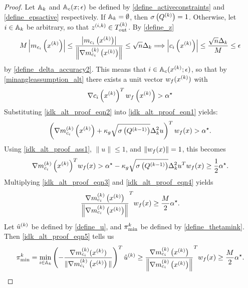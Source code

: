 \begin{proof}
Let ${\mathbb A_{k}}$ and ${\mathbb A_c}(x; \epsilon)$
be defined by
\cref{define_activeconstraints} and \cref{define_epsactive}
respectively.
If ${\mathbb A_{k}} = \emptyset$, then $\sigma\left({Q^{(k)}}\right) = 1$.
Otherwise, let $i \in {\mathbb A_{k}}$ be arbitrary,
so that ${z^{(i, k)}} \in {T_{\text{out}}^{(k)}}$. By \cref{define_z}
\begin{align*}
M \left|m_{c_i}\left(x^{(k)}\right)\right| \le \frac{\left|m_{c_i}\left(x^{(k)}\right)\right|}{\left\|{\nabla m_{c_i}^{(k)}\left(x^{(k)}\right)}\right\|} \le \sqrt{n} \Delta_k \Longrightarrow
\left|c_i\left(x^{(k)}\right)\right| \le \frac{\sqrt{n}\Delta_k}{M} \le \epsilon
\end{align*}
by \cref{define_delta_accuracy2}.
This means that $i \in {\mathbb A_c}(x^{(k)}; \epsilon)$, so that by \cref{minangleassumption_alt} there exists a unit vector ${w_f}(x^{(k)})$ with
\begin{align}
\nabla c_i\left(x^{(k)}\right)^T{w_f}\left(x^{(k)}\right) > { \alpha^{\star} } \label{idk_alt_proof_eqn1}
\end{align}
Substituting \cref{idk_alt_proof_eqn2} into \cref{idk_alt_proof_eqn1} yields:
\begin{align*}
\left({\nabla m_{c_i}^{(k)}\left(x^{(k)}\right)} + \kappa_g \sqrt{\sigma\left( Q^{(k-1)} \right)}\Delta_k^2 u\right)^T {w_f}(x) > { \alpha^{\star} }.
\end{align*}
Using \cref{idk_alt_proof_ass1}, $\|u\|\le 1$, and $\|{w_f}(x)\| = 1$, this becomes
\begin{align}
{\nabla m_{c_i}^{(k)}\left(x^{(k)}\right)}^T{w_f}(x) 
> { \alpha^{\star} } - \kappa_g \sqrt{\sigma\left( Q^{(k-1)} \right)}\Delta_k^2 u^T{w_f}(x) 
\ge \frac 1 2 { \alpha^{\star} }. \label{idk_alt_proof_eqn3}
\end{align}
Multiplying \cref{idk_alt_proof_eqn3} and \cref{idk_alt_proof_eqn4} yields
\begin{align}
\frac{{\nabla m_{c_i}^{(k)}\left(x^{(k)}\right)}}{\left\|{\nabla m_{c_i}^{(k)}\left(x^{(k)}\right)}\right\|}^T  {w_f}(x) \ge \frac M 2 { \alpha^{\star} }. \label{idk_alt_proof_eqn5}
\end{align}
Let ${{\hat u}^{(k)}}$ be defined by \cref{define_u}, 
and ${\pi^k_{\textrm{min}}}$ be defined by \cref{define_thetamink}.
Then \cref{idk_alt_proof_eqn5} tells us 
\begin{align*}
{\pi^k_{\textrm{min}}} = \min_{i \in {\mathbb A_{k}}} \left(-{\frac{\nabla m^{(k)}_{c_i}(x^{(k)})}{\|\nabla m^{(k)}_{c_i}\left(x^{(k)}\right)\|}}\right)^T {{\hat u}^{(k)}} \ge \frac{{\nabla m_{c_i}^{(k)}\left(x^{(k)}\right)}}{\left\|{\nabla m_{c_i}^{(k)}\left(x^{(k)}\right)}\right\|}^T {w_f}(x) \ge \frac M 2 { \alpha^{\star} }.
\end{align*}


\end{proof}

